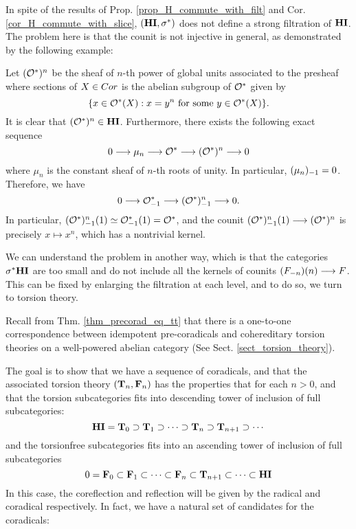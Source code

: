 
In spite of the results of Prop. \ref{prop_H_commute_with_filt} 
and Cor. \ref{cor_H_commute_with_slice}, $(\HI, \sgHI{*})$ does 
not define a strong filtration of $\HI$. The problem here is 
that the counit is not injective in general, as demonstrated by 
the following example: 

\begin{ex}\label{ex_Oxn}
Let $(\Ox)^n$ be the sheaf of $n$-th power of global units 
associated to the presheaf where sections of $X \in \Cor$ is the 
abelian subgroup of $\Ox$ given by 
\[
\{x \in \Ox(X) : x=y^n\textrm{ for some }y \in \Ox(X)\}.
\]
It is clear that $(\Ox)^n \in \HI$. Furthermore, there exists the 
following exact sequence 
\[
0 \to \mu_n \to \Ox \to (\Ox)^n \to 0
\]
where $\mu_n$ is the constant sheaf of $n$-th roots of unity.
In particular, $\RHI{(\mu_n)} = 0$. Therefore, we have
\[
0 \to \RHI{\Ox} \to \RHI{(\Ox)^{n}} \to 0.
\]
In particular, $\LHI{\RHI{(\Ox)^n}} \simeq \LHI{\RHI{\Ox}} = \Ox$, 
and the counit $\LHI{\RHI{(\Ox)^n}} \to (\Ox)^n$ is precisely $x 
\mapsto x^n$, which has a nontrivial kernel.
\end{ex}
\vskip 10pt
We can understand the problem in another way, which is that the 
categories $\sgHI{*}\HI$ are too small and do not include all
the kernels of counits $\LHI[n]{(\RHI[n]{F})} \to F$. This can be 
fixed by enlarging the filtration at each level, and to do so, we 
turn to torsion theory.

Recall from Thm. \ref{thm_precorad_eq_tt} that there is a 
one-to-one correspondence between idempotent pre-coradicals and 
cohereditary torsion theories on a well-powered abelian category 
(See Sect.  \ref{sect_torsion_theory}).

The goal is to show that we have a sequence of coradicals, and
that the associated torsion theory $(\TCat{n}, \TFCat{n})$ has
the properties that for each $n > 0$, and that the torsion 
subcategories fits into descending tower of inclusion of full 
subcategories:
\[
\HI = \TCat{0} \supset \TCat{1} \supset \cdots \supset \TCat{n} 
   \supset \TCat{n + 1} \supset \cdots
\]
and the torsionfree subcategories fits into an ascending tower
of inclusion of full subcategories
\[
0 = \TFCat{0} \subset \TFCat{1} \subset \cdots \subset \TFCat{n}
   \subset \TCat{n + 1} \subset \cdots \subset \HI
\]
In this case, the coreflection and reflection will be given by
the radical and coradical respectively. In fact, we have a
natural set of candidates for the coradicals:

